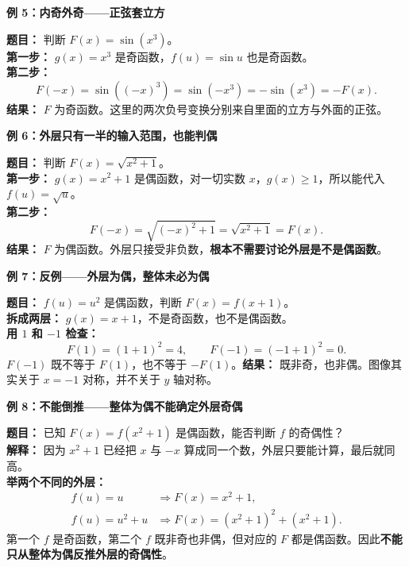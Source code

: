 \clearpage
\begin{examplebox}
\textbf{\textcolor{CExample}{例 5：内奇外奇——正弦套立方}}


\textbf{题目：} 判断 $F(x)=\sin(x^3)$。\\
\textbf{第一步：} $g(x)=x^3$ 是奇函数，$f(u)=\sin u$ 也是奇函数。\\
\textbf{第二步：}
\[
F(-x)=\sin((-x)^3)=\sin(-x^3)=-\sin(x^3)=-F(x).
\]
\textbf{结果：} $F$ 为奇函数。这里的两次负号变换分别来自里面的立方与外面的正弦。

\medskip

\end{examplebox}
\clearpage
\begin{examplebox}
\textbf{\textcolor{CExample}{例 6：外层只有一半的输入范围，也能判偶}}


\textbf{题目：} 判断 $F(x)=\sqrt{x^2+1}$。\\
\textbf{第一步：} $g(x)=x^2+1$ 是偶函数，对一切实数 $x$，$g(x)\geqslant1$，所以能代入 $f(u)=\sqrt{u}$。\\
\textbf{第二步：}
\[
F(-x)=\sqrt{(-x)^2+1}=\sqrt{x^2+1}=F(x).
\]
\textbf{结果：} $F$ 为偶函数。外层只接受非负数，\textbf{根本不需要讨论外层是不是偶函数}。

\medskip

\end{examplebox}
\clearpage
\begin{examplebox}
\textbf{\textcolor{CExample}{例 7：反例——外层为偶，整体未必为偶}}


\textbf{题目：} $f(u)=u^2$ 是偶函数，判断 $F(x)=f(x+1)$。\\
\textbf{拆成两层：} $g(x)=x+1$，不是奇函数，也不是偶函数。\\
\textbf{用 $1$ 和 $-1$ 检查：}
\[
F(1)=(1+1)^2=4,\qquad F(-1)=(-1+1)^2=0.
\]
$F(-1)$ 既不等于 $F(1)$，也不等于 $-F(1)$。\textbf{结果：} 既非奇，也非偶。图像其实关于 $x=-1$ 对称，并不关于 $y$ 轴对称。

\medskip

\end{examplebox}
\clearpage
\begin{examplebox}
\textbf{\textcolor{CExample}{例 8：不能倒推——整体为偶不能确定外层奇偶}}


\textbf{题目：} 已知 $F(x)=f(x^2+1)$ 是偶函数，能否判断 $f$ 的奇偶性？\\
\textbf{解释：} 因为 $x^2+1$ 已经把 $x$ 与 $-x$ 算成同一个数，外层只要能计算，最后就同高。\\
\textbf{举两个不同的外层：}
\[
\begin{array}{ll}
f(u)=u &\Longrightarrow F(x)=x^2+1,\\
f(u)=u^2+u &\Longrightarrow F(x)=(x^2+1)^2+(x^2+1).
\end{array}
\]
第一个 $f$ 是奇函数，第二个 $f$ 既非奇也非偶，但对应的 $F$ 都是偶函数。因此\textbf{不能只从整体为偶反推外层的奇偶性}。

\medskip

\end{examplebox}
